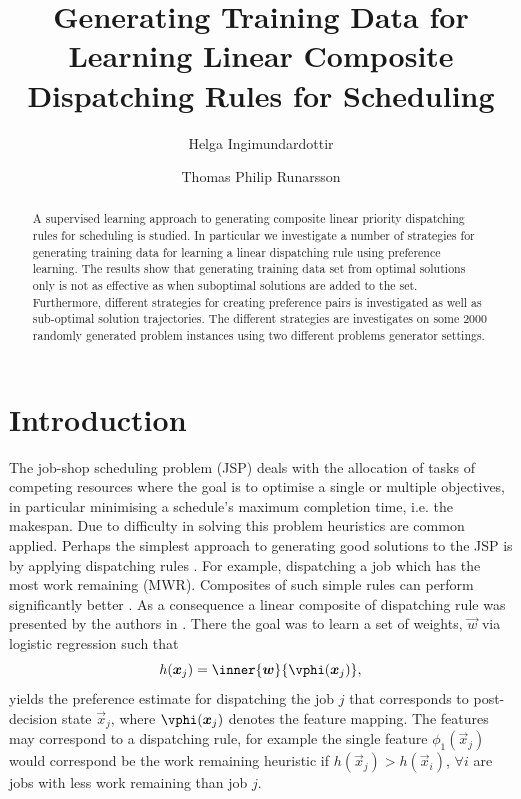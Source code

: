 \documentclass[smallextended]{llncs}
\title{Generating Training Data for Learning Linear Composite Dispatching Rules for Scheduling}
\author{Helga Ingimundardottir \and Thomas Philip Runarsson}
\institute{{School of Engineering and Natural Sciences, University of Iceland}\\
\email{hei2@hi.is} and \email{tpr@hi.is}}
\begin{document}
\maketitle


\begin{abstract}
A supervised learning approach to generating composite linear priority dispatching rules for scheduling is studied. In particular we investigate a number of strategies for generating training data for learning a linear dispatching rule using preference learning. The results show that generating training data set from optimal solutions only is not as effective as when suboptimal solutions are added to the set. Furthermore, different strategies for creating preference pairs is investigated as well as sub-optimal solution trajectories. The different strategies are investigates on some 2000 randomly generated problem instances using two different problems generator settings.
\end{abstract}

\section{Introduction}
The job-shop scheduling problem (JSP) deals with the allocation of tasks of competing resources where the goal is to 
optimise a single or multiple objectives, in particular minimising a schedule's maximum completion time, i.e. the 
makespan. Due to difficulty in solving this problem heuristics are common applied. Perhaps the simplest approach to 
generating good solutions to the JSP is by applying dispatching rules \cite{Panwalkar77}. For example, dispatching a 
job which has the most work remaining (MWR). Composites of such simple rules can perform significantly better 
\cite{Jayamohan04}. As a consequence a linear composite of dispatching rule was presented by the authors in 
\cite{InRu11a}. There the goal was to learn a set of weights, $\vec{w}$ via logistic regression such that 
\begin{equation}\label{eq:jssp:linweights}
h(\vec{x}_j)=\inner{\vec{w}}{\vphi(\vec{x}_j)},
\end{equation}
yields the preference estimate for dispatching the job $j$ that corresponds to post-decision state $\vec{x}_j$, where 
$\vphi(\vec{x}_j)$ denotes the feature mapping. The features may correspond to a dispatching rule, for example the 
single feature $\phi_1(\vec{x}_j) $ would correspond be the work remaining heuristic if 
$h(\vec{x}_j)>h(\vec{x}_i)$, $\forall i$ are jobs with less work remaining than job $j$. 
\end{document}
